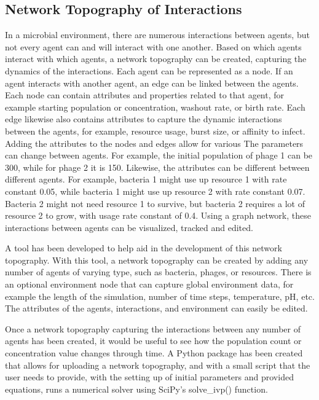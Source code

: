 \subsection{Network Topography of Interactions}
In a microbial environment, there are numerous interactions between agents, but not every agent can and will interact with one another.
Based on which agents interact with which agents, a network topography can be created, capturing the dynamics of the interactions.
Each agent can be represented as a node.
If an agent interacts with another agent, an edge can be linked between the agents.
Each node can contain attributes and properties related to that agent, for example starting population or concentration, washout rate, or birth rate.
Each edge likewise also contains attributes to capture the dynamic interactions between the agents, for example, resource usage, burst size, or affinity to infect.
Adding the attributes to the nodes and edges allow for various The parameters can change between agents.
For example, the initial population of phage 1 can be 300, while for phage 2 it is 150.
Likewise, the attributes can be different between different agents.
For example, bacteria 1 might use up resource 1 with rate constant 0.05, while bacteria 1 might use up resource 2 with rate constant 0.07.
Bacteria 2 might not need resource 1 to survive, but bacteria 2 requires a lot of resource 2 to grow, with usage rate constant of 0.4.
Using a graph network, these interactions between agents can be visualized, tracked and edited. \newline 

A tool has been developed to help aid in the development of this network topography.
With this tool, a network topography can be created by adding any number of agents of varying type, such as bacteria, phages, or resources.
There is an optional environment node that can capture global environment data, for example the length of the simulation, number of time steps, temperature, pH, etc.
The attributes of the agents, interactions, and environment can easily be edited. \newline 

Once a network topography capturing the interactions between any number of agents has been created, it would be useful to see how the population count or concentration value changes through time. 
A Python package has been created that allows for uploading a network topography, and with a small script that the user needs to provide, with the setting up of initial parameters and provided equations, runs a numerical solver using SciPy's solve\_ivp() function.  
